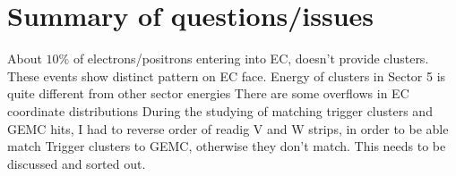 \documentclass[letterpaper,12pt]{article}
\begin{document}
\newpage
\section{Summary of questions/issues}
\vskip 1cm
About $10\%$ of electrons/positrons entering into EC, doesn't provide clusters. These events show distinct pattern on EC face.
\vskip 1cm \noindent
Energy of clusters in Sector 5 is quite different from other sector energies
\vskip 1cm \noindent
There are some overflows in EC coordinate distributions
\vskip 2cm \noindent
During the studying of matching trigger clusters and GEMC hits, I had to reverse order of readig V and W strips, in order to be able match  Trigger clusters to GEMC, otherwise they don't match. 
This needs to be discussed and sorted out.
\end{document}
